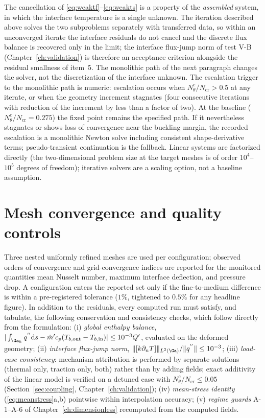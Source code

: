 The cancellation of \eqref{eq:weaktf}--\eqref{eq:weakts} is a property of the \emph{assembled}
system, in which the interface temperature is a single unknown. The iteration described above solves
the two subproblems separately with transferred data, so within an unconverged iterate the interface
residuals do not cancel and the discrete flux balance is recovered only in the limit; the interface
flux-jump norm of test V-B (Chapter~\ref{ch:validation}) is therefore an acceptance criterion
alongside the residual smallness of item~5. The monolithic path of the next paragraph changes the
solver, not the discretization of the interface unknown.
The escalation trigger to the monolithic path is numeric: escalation occurs when
$N_\theta^c/N_{\mathrm{cr}}>0.5$ at any iterate, or when the geometry increment stagnates
(four consecutive iterations with reduction of the increment by less than a factor of two). At
the baseline ($N_\theta^c/N_{\mathrm{cr}}=0.275$) the fixed point remains the specified path.
If it nevertheless stagnates or shows loss of convergence near the buckling margin,
the recorded escalation is a monolithic Newton solve including consistent shape-derivative terms;
pseudo-transient continuation is the fallback. Linear systems are factorized directly (the
two-dimensional problem size at the target meshes is of order $10^4$--$10^5$ degrees of freedom);
iterative solvers are a scaling option, not a baseline assumption.

\section{Mesh convergence and quality controls}
\label{sec:quality}
Three nested uniformly refined meshes are used per configuration; observed orders of convergence
and grid-convergence indices are reported for the monitored quantities mean Nusselt number, maximum
interface deflection, and pressure drop. A configuration enters the reported set only if the
fine-to-medium difference is within a pre-registered tolerance ($1\%$, tightened to $0.5\%$ for any
headline figure). In addition to the residuals, every computed run must satisfy, and tabulate, the
following conservation and consistency checks, which follow directly from the formulation:
(i) \emph{global enthalpy balance},
$|\int_{\Ga_h}q^{''}\mathrm ds-\dot m'c_p(T_{b,\mathrm{out}}-T_{b,\mathrm{in}})|\le10^{-3}Q'$,
evaluated on the deformed geometry;
(ii) \emph{interface flux-jump norm}, $\|[k\partial_nT]\|_{L^2(\Ga)}/\|q^{''}\|\le10^{-3}$;
(iii) \emph{load-case consistency}: mechanism attribution is performed by separate solutions
(thermal only, traction only, both) rather than by adding fields; exact additivity of the linear
model is verified on a detuned case with $N_\theta^c/N_{\mathrm{cr}}\le0.05$
(Section~\ref{sec:coupling}, Chapter~\ref{ch:validation});
(iv) \emph{mean-stress identity} (\ref{eq:meanstress}a,b) pointwise within interpolation accuracy;
(v) \emph{regime guards} A-1--A-6 of Chapter~\ref{ch:dimensionless} recomputed from the computed
fields.


